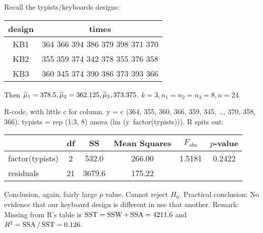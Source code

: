 \example Recall the typists/keyboards designs:
\begin{center}
    \begin{tabular}{|c|c|}
         \hline
         design & times\\
         \hline
         KB1 & 364 366 394 386 379 398 371 370\\
         KB2 & 355 359 374 342 378 355 376 358\\
         KB3 & 360 345 374 390 386 373 393 366\\
         \hline
    \end{tabular}
\end{center}
Then $\widehat{\mu}_1 = 378.5, \widehat{\mu}_2 = 362.125, \widehat{\mu}_3, 373.375$. $k=3, n_1 = n_2 = n_3 = 8, n=24$.

\nl R-code, with little c for column. { y = c (364, 355, 360, 366, 359, 345, \dots, 370, 358, 366)}.
typists = rep (1:3, 8) anova (lm (y~factor(typists))). R spits out:
\begin{center}
    \begin{tabular}{|l|c c c c c|}
         \hline
          & df & SS & Mean Squares & $F_{\text{obs}}$ & $p$-value\\
         \hline
         factor(typists) & 2 & 532.0 & 266.00 & 1.5181 & 0.2422 \\
         residuals & 21 & 3679.6 & 175.22 & & \\
         \hline
    \end{tabular}
\end{center}
Conclusion, again, fairly large $p$ value. Cannot reject $H_0$. Practical conclusion: No evidence that our keyboard design is different in use that another. Remark: Missing from R's table is $\operatorname{SST} = \operatorname{SSW} + \operatorname{SSA} = 4211.6$ and $R^2 = \operatorname{SSA}/\operatorname{SST} = 0.126$.

